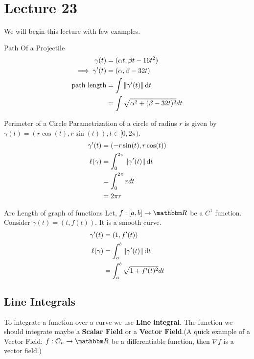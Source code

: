 \documentclass[Analysis-3]{subfiles}
\begin{document}
\chapter*{Lecture 23} %
\setcounter{chapter}{23} %
\setcounter{section}{0}

We will begin this lecture with few examples.
\begin{Eg}{Path Of a Projectile}{}
    \begin{align*}
        \gamma(t)           & =(\alpha t, \beta t-16t^2)               \\
        \implies \gamma'(t) & = (\alpha, \beta -32t)                   \\
        \text{path length}  & = \int \norm{\gamma'(t)}\dd{t}           \\
                            & = \int \sqrt{\alpha^2 +(\beta-32t)^2} dt
    \end{align*}
\end{Eg}

\begin{Eg}{Perimeter of a Circle}{}
    Parametrization of a circle of radius $r$ is given by $\gamma(t) = (r\cos(t),r\sin(t)), t \in [0,2\pi)$.
    \begin{align*}
        \gamma'(t)    & = (-r\sin(t),r\cos(t))                    \\
        \ell (\gamma) & = \int_{0}^{2\pi} \norm{\gamma'(t)}\dd{t} \\
                      & = \int_{0}^{2\pi} r dt                    \\
                      & = 2\pi r
    \end{align*}
\end{Eg}

\begin{Eg}{Arc Length of graph of functions}{}
    Let, $f : [a,b]\to \R$ be a $C^1$ function. Consider $\gamma(t)=(t, f(t))$. It is a smooth curve.
    \begin{align*}
        \gamma'(t)    & = (1,f'(t))                            \\
        \ell (\gamma) & = \int_{a}^{b} \norm{\gamma'(t)}\dd{t} \\
                      & = \int_{a}^{b} \sqrt{1 + f'(t)^2} dt
    \end{align*}
\end{Eg}

\section{Line Integrals}
To integrate a function over a curve we use \textbf{Line integral}. The function we should integrate maybe a \textbf{Scalar Field} or a \textbf{Vector Field}.(A quick example of a Vector Field: $f : \Op{n} \to \R$ be a differentiable function, then $\nabla f$ is a vector field.)
\end{document}
